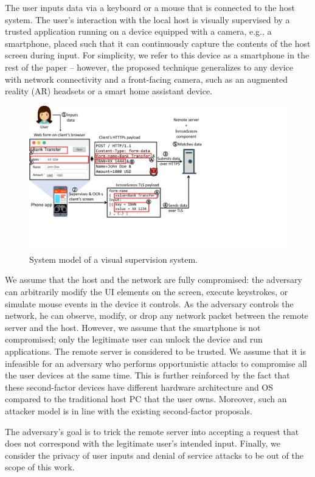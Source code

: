 The user inputs data via a keyboard or a mouse that is connected to the host system. The user's interaction with the local host is visually supervised by a trusted application running on a device equipped with a camera, e.g., a smartphone, placed such that it can continuously capture the contents of the host screen during input. 
For simplicity, we refer to this device as a smartphone in the rest of the paper -- however, the proposed technique generalizes to any device with network connectivity and a front-facing camera, such as an augmented reality (AR) headsets or a smart home assistant device.

\begin{figure}[t]
	\centering
    \includegraphics[trim={0 3.7cm 11.2cm 0},clip,width=\linewidth]{chapters/IntegriScreen/newImg/overview-vertical.pdf}
	\caption{System model of a visual supervision system.}
	\label{integriscreen:fig:systemModel}
\end{figure}


We assume that the host and the network are fully compromised: the adversary can arbitrarily modify the UI elements on the screen, execute keystrokes, or simulate mouse events in the device it controls. As the adversary controls the network, he can observe, modify, or drop any network packet between the remote server and the host.
However, we assume that the smartphone is not compromised; only the legitimate user can unlock the device and run applications. The remote server is considered to be trusted. 
We assume that it is infeasible for an adversary who performs opportunistic attacks to compromise all the user devices at the same time. This is further reinforced by the fact that these second-factor devices have different hardware architecture and OS compared to the traditional host PC that the user owns. Moreover, such an attacker model is in line with the existing second-factor proposals.

The adversary's goal is to trick the remote server into accepting a request that does not correspond with the legitimate user's intended input.
Finally, we consider the privacy of user inputs and denial of service attacks to be out of the scope of this work.
